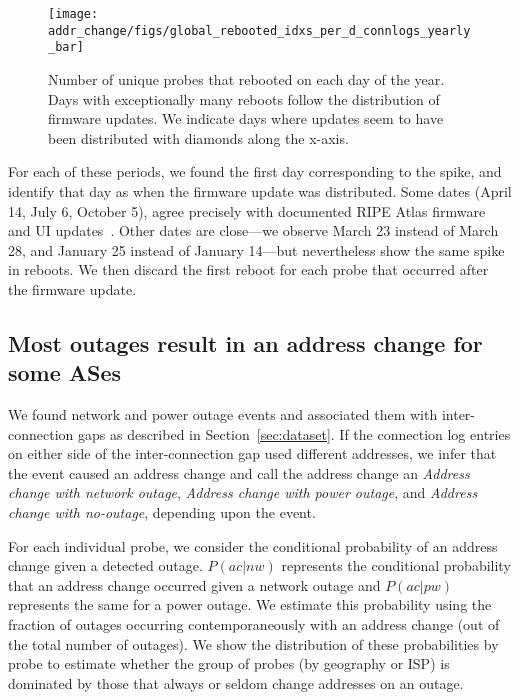 \begin{figure*}[tb]
  \begin{center}
    \texttt{[image: addr\_change/figs/global\_rebooted\_idxs\_per\_d\_connlogs\_yearly\_bar]}
  \end{center}
  \caption[Number of unique
    RIPE Atlas probes that rebooted on each day of the year]{\label{fig:global_rebooted_idxs_per_d} Number of unique
    probes that rebooted on each day of the year.  Days with exceptionally
    many reboots follow the distribution of firmware updates.  We indicate
    days where updates seem to have been distributed with 
    diamonds along the x-axis.}
\end{figure*}
For each of these periods, we found the first day
corresponding to the spike, and identify that day as when
the firmware update was distributed.  Some dates (April 14,
July 6, October 5), agree precisely with documented
RIPE Atlas firmware and UI
updates~\cite{atlas-firmware-updates}. Other dates are close---we
observe March 23 instead of March 28, and January 25 instead
of January 14---but nevertheless show the same spike in reboots.
We then discard the first reboot for each probe that occurred
after the firmware update.

\subsection{Most outages result in an address change for some ASes}

We found network and power outage events and associated them with inter-connection gaps as
described in Section~\ref{sec:dataset}. If the connection log entries
on either side of the inter-connection gap used different
addresses, we infer that the event caused an address change and call
the address change an \emph{Address change with network outage},
\emph{Address change with power outage}, and \emph{Address change with
no-outage}, depending upon the event.

For each individual probe, we consider the conditional
probability of an address change given a detected
outage. $P(ac|nw)$
represents the conditional probability that an address change occurred
given a network outage and $P(ac|pw)$ represents the same for a power outage.
We estimate this probability using the
fraction of outages occurring contemporaneously with an address change (out of the
total number of outages).  We show the distribution of
these probabilities by probe to estimate whether the group
of probes (by geography or ISP) is dominated by those that
always or seldom change addresses on an outage.

